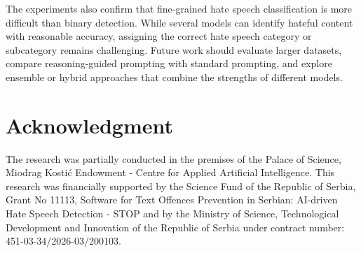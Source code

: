 \documentclass[a4paper]{article}
\begin{document}
The experiments also confirm that fine-grained hate speech classification is more difficult than binary detection. While several models can identify hateful content with reasonable accuracy, assigning the correct hate speech category or subcategory remains challenging. Future work should evaluate larger datasets, compare reasoning-guided prompting with standard prompting, and explore ensemble or hybrid approaches that combine the strengths of different models.

\section*{Acknowledgment}

The research was partially conducted in the premises of the Palace of Science, Miodrag Kostić Endowment - Centre for Applied Artificial Intelligence. This research was financially supported by the Science Fund of the Republic of Serbia, Grant No 11113, Software for Text Offences Prevention in Serbian: AI-driven Hate Speech Detection - STOP and by the Ministry of Science, Technological Development and Innovation of the Republic of Serbia under contract number: 451-03-34/2026-03/200103.

\small


\end{document}
